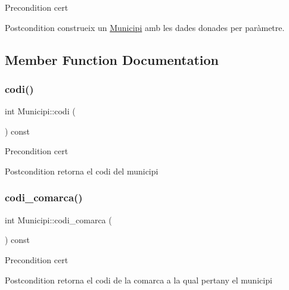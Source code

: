 \begin{DoxyPrecond}{Precondition}
cert 
\end{DoxyPrecond}
\begin{DoxyPostcond}{Postcondition}
construeix un \hyperlink{classMunicipi}{Municipi} amb les dades donades per paràmetre. 
\end{DoxyPostcond}


\subsection{Member Function Documentation}
\mbox{\label{classMunicipi_aa4a717b35e739dd728eb83eff99ebe70}} 
\subsubsection{\texorpdfstring{codi()}{codi()}}
{\footnotesize\ttfamily int Municipi\+::codi (\begin{DoxyParamCaption}{ }\end{DoxyParamCaption}) const}

\begin{DoxyPrecond}{Precondition}
cert 
\end{DoxyPrecond}
\begin{DoxyPostcond}{Postcondition}
retorna el codi del municipi 
\end{DoxyPostcond}
\mbox{\label{classMunicipi_ae95581bf220eb0e8bf0b70d423e2a57b}} 
\subsubsection{\texorpdfstring{codi\+\_\+comarca()}{codi\_comarca()}}
{\footnotesize\ttfamily int Municipi\+::codi\+\_\+comarca (\begin{DoxyParamCaption}{ }\end{DoxyParamCaption}) const}

\begin{DoxyPrecond}{Precondition}
cert 
\end{DoxyPrecond}
\begin{DoxyPostcond}{Postcondition}
retorna el codi de la comarca a la qual pertany el municipi 
\end{DoxyPostcond}
\mbox{\label{classMunicipi_a66542f3f6e1a538f9fd6300bbe9bd147}} 

